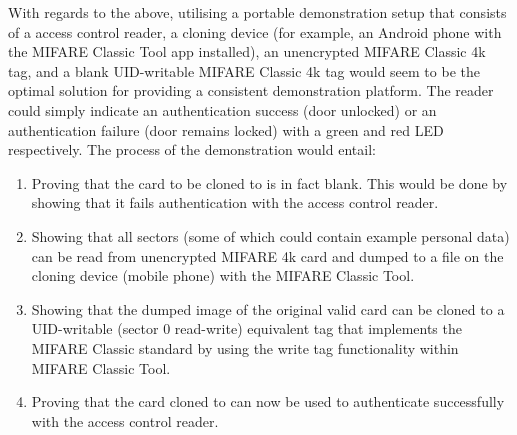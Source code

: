 With regards to the above, utilising a portable demonstration setup that consists of a access control reader, a cloning device (for example, an Android phone with the MIFARE Classic Tool app installed), an unencrypted MIFARE Classic 4k tag, and a blank UID-writable MIFARE Classic 4k tag would seem to be the optimal solution for providing a consistent demonstration platform. The reader could simply indicate an authentication success (door unlocked) or an authentication failure (door remains locked) with a green and red LED respectively. The process of the demonstration would entail:

\begin{enumerate}
  \item Proving that the card to be cloned to is in fact blank. This would be done by showing that it fails authentication with the access control reader.
  \item Showing that all sectors (some of which could contain example personal data) can be read from unencrypted MIFARE 4k card and dumped to a file on the cloning device (mobile phone) with the MIFARE Classic Tool.
  \item Showing that the dumped image of the original valid card can be cloned to a UID-writable (sector 0 read-write) equivalent tag that implements the MIFARE Classic standard by using the write tag functionality within MIFARE Classic Tool.
  \item Proving that the card cloned to can now be used to authenticate successfully with the access control reader.
\end{enumerate}
